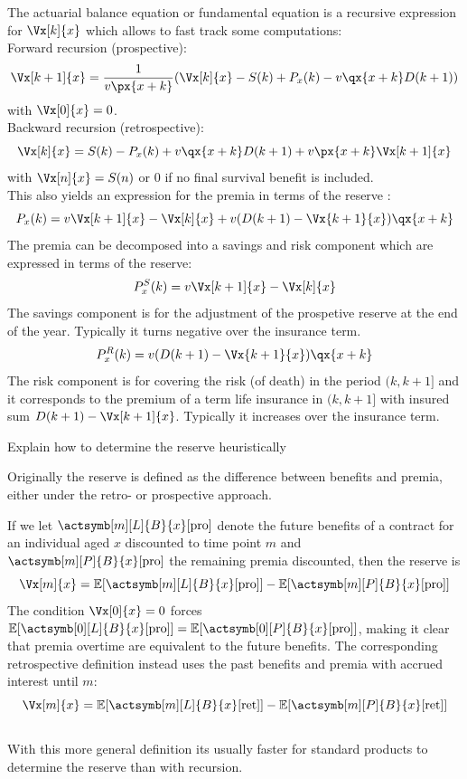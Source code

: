 \documentclass[11pt,a4paper,twoside]{article}
\begin{document}
The actuarial balance equation or fundamental equation is a recursive expression for \( \Vx[k]{x} \) which allows to fast track some computations: \\
Forward recursion (prospective):
\[ \Vx[k+1]{x} = \frac{1}{v \px{x+k}}(\Vx[k]{x} - S(k) + P_x(k) - v\qx{x+k} D(k+1)) \]
with \( \Vx[0]{x} = 0 \). \\
Backward recursion (retrospective):
\[ \Vx[k]{x} = S(k) - P_x(k) + v \qx{x+k} D(k+1) + v\px{x+k} \Vx[k+1]{x} \]
with \( \Vx[n]{x} = S(n) \) or \( 0 \) if no final survival benefit is included. \\

This also yields an expression for the premia in terms of the reserve :
\[ P_x(k) = v \Vx[k+1]{x} - \Vx[k]{x} + v(D(k+1) - \Vx{k+1}{x})\qx{x+k}\]
The premia can be decomposed into a savings and risk component which are expressed in terms of the reserve:
\[ P^S_x(k) = v  \Vx[k+1]{x} - \Vx[k]{x} \]
The savings component is for the adjustment of the prospetive reserve at the end of the year.
Typically it turns negative over the insurance term. 
\[ P^R_x(k) = v(D(k+1) - \Vx{k+1}{x})\qx{x+k} \]
The risk component is for covering the risk (of death) in the period \( (k, k+1] \) and it corresponds
to the premium of a term life insurance in \( (k, k+1] \) with insured sum \( D(k+1) - \Vx[k+1]{x} \).
Typically it increases over the insurance term.


Explain how to determine the reserve heuristically

Originally the reserve is defined as the difference between benefits and premia, either under the retro- or prospective approach.

If we let \( \actsymb[m][L]{B}{x}[\text{pro}] \) denote the future benefits of a contract for an individual aged \( x \) 
discounted to time point \( m \) and \( \actsymb[m][P]{B}{x}[\text{pro}] \) the remaining premia discounted, then the reserve is
\[ \Vx[m]{x} = \mathbb{E}[\actsymb[m][L]{B}{x}[\text{pro}]] - \mathbb{E}[\actsymb[m][P]{B}{x}[\text{pro}]] \]
The condition \(\Vx[0]{x} = 0\) forces \( \mathbb{E}[\actsymb[0][L]{B}{x}[\text{pro}]] = \mathbb{E}[\actsymb[0][P]{B}{x}[\text{pro}]] \),
making it clear that premia overtime are equivalent to the future benefits.
The corresponding retrospective definition instead uses the past benefits and premia with accrued interest until \( m \):
\[ \Vx[m]{x} = \mathbb{E}[\actsymb[m][L]{B}{x}[\text{ret}]] - \mathbb{E}[\actsymb[m][P]{B}{x}[\text{ret}]] \]
\\
With this more general definition its usually faster for standard products to determine the reserve than with recursion.
\end{document}
